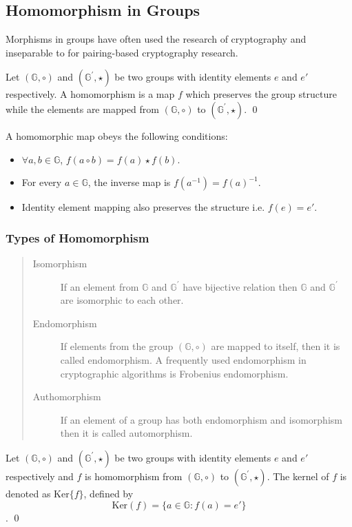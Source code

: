 \subsection{Homomorphism in Groups }
Morphisms in groups have often used the research of cryptography and inseparable to for pairing-based cryptography research.
\begin{definition}
	Let $(\mathbb{G},\circ)$ and $(\mathbb{G}^{'},\star)$ be two groups with identity elements $e$ and $e'$ respectively.
	A homomorphism  is a map $f$ which preserves the group structure while the elements are mapped from $(\mathbb{G},\circ)$ to $(\mathbb{G}^{'},\star)$.
	\qed
\end{definition}
A homomorphic map obeys the following conditions:
\begin{itemize}
	\item $\forall a,b \in \mathbb{G}$, $f(a \circ b) = f(a) \star f(b)$.
	\item  For every $a \in \mathbb{G}$, the inverse map is $f(a^{-1}) = f(a)^{-1}$.
	\item  Identity element mapping also preserves the structure i.e. $f(e) =e'$.
\end{itemize}

\subsubsection{Types of Homomorphism}
\begin{quote}
	\begin{description}
		\item[Isomorphism ] If an element from $\mathbb{G}$  and $\mathbb{G}^{'}$ have bijective relation then $\mathbb{G}$ and $\mathbb{G}^{'}$ are isomorphic to each other.
		
		\item[Endomorphism  ]  If elements from the group $(\mathbb{G},\circ)$ are mapped to itself, then it is called endomorphism. 
		A frequently used endomorphism in cryptographic algorithms is Frobenius endomorphism. 
		
		\item[Authomorphism  ] If an element of a group has both endomorphism and isomorphism then it is called automorphism.
	\end{description}
\end{quote}

\begin{definition}
	Let $(\mathbb{G},\circ)$ and $(\mathbb{G}^{'},\star)$ be two groups with identity elements $e$ and $e'$ respectively and $f$ is homomorphism from $(\mathbb{G},\circ)$ to $(\mathbb{G}^{'},\star)$.
	The kernel of $f$ is denoted as $\text{Ker}\{f\}$, defined by 
	$$\text{Ker}(f) = \{ a \in \mathbb{G}: f(a) = e'\}$$.
	\qed
\end{definition}

